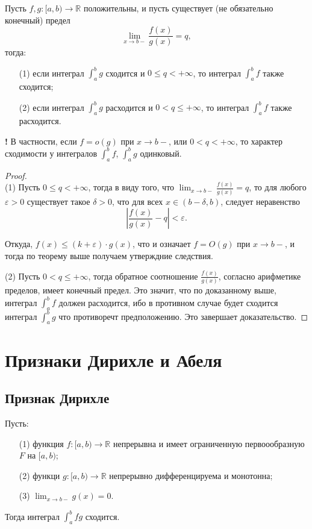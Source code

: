 \begin{corollary}
    Пусть $f,g:[a,b) \to \mathbb{R}$ положительны, и пусть существует (не обязательно конечный) предел
    \[
     \lim_{x\to b-}\frac{f(x)}{g(x)} = q, 
    \]
    тогда:
    \begin{itemize}
        \item[(1)] если интеграл $\int_a^b g$ сходится и $0\le q < +\infty$, то интеграл $\int_a^b f$ также сходится;
        \item[(2)] если интеграл $\int_a^b g$ расходится и $0< q \le +\infty$, то интеграл $\int_a^b f$ также расходится.
    \end{itemize}
\end{corollary}
\begin{mydangerr}{\bf !}
    В частности, если $f = o(g)$ при $x \to b-$, или $0<q<+\infty$, то характер сходимости у интегралов $\int_a^b f$, $\int_a^b g$ одинковый.
\end{mydangerr}
\begin{proof}~\\
(1) Пусть $0 \le q < +\infty$, тогда в виду того, что $\lim_{x\to b-}\frac{f(x)}{g(x)} = q$, то для любого $\varepsilon>0$ существует такое $\delta >0$, что для всех $x \in (b-\delta, b)$, следует неравенство 
\[
 \left| \frac{f(x)}{g(x)} - q \right|<\varepsilon.
\]

Откуда, $f(x) \le (k+\varepsilon)\cdot g(x)$, что и означает $f = O(g)$ при $x \to b-$, и тогда по теорему выше получаем утверждние следствия.

(2) Пусть $0<q \le +\infty$, тогда обратное соотношение $\frac{f(x)}{g(x)}$, согласно арифметике пределов, имеет конечный предел. Это значит, что по доказанному выше, интеграл $\int_a^b f$ должен расходится, ибо в противном случае будет сходится интеграл $\int_a^b g$ что противоречт предположению. Это завершает доказательство.    
\end{proof}


\section{Признаки Дирихле и Абеля}

\subsection{Признак Дирихле}

\begin{theorem}
    Пусть:
    \begin{itemize}
         \item[(1)] функция $f:[a,b) \to \mathbb{R}$ непрерывна и имеет ограниченную первоообразную $F$ на $[a,b)$;
        \item[(2)] функци $g:[a,b) \to \mathbb{R}$ непрерывно дифференцируема и монотонна;
        \item[(3)] $\lim_{x \to b-} g(x) = 0$.
    \end{itemize}
    Тогда интеграл $\int_a^b fg$ сходится.
\end{theorem}

